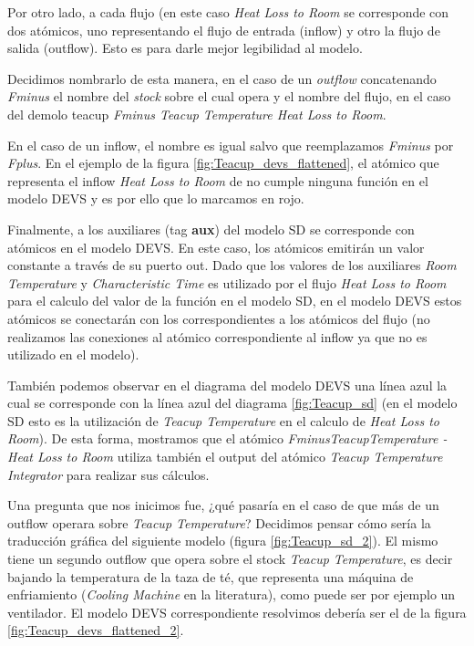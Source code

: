 Por otro lado, a cada flujo (en este caso \textit{Heat Loss to Room} se corresponde con dos atómicos, uno representando el flujo de entrada (inflow) y otro la flujo de salida (outflow). Esto es para darle mejor legibilidad al modelo.

Decidimos nombrarlo de esta manera, en el caso de un \textit{outflow} concatenando \textit{Fminus} el nombre del \textit{stock} sobre el cual opera y el nombre del flujo, en el caso del demolo teacup \textit{Fminus Teacup Temperature Heat Loss to Room}.

En el caso de un inflow, el nombre es igual salvo que reemplazamos \textit{Fminus} por \textit{Fplus}. En el ejemplo de la figura \ref{fig:Teacup_devs_flattened}, el atómico que representa el inflow \textit{Heat Loss to Room} de no cumple ninguna función en el modelo DEVS y es por ello que lo marcamos en rojo. 

Finalmente, a los auxiliares (tag \textbf{aux}) del modelo SD se corresponde con atómicos en el modelo DEVS. En este caso, los atómicos emitirán un valor constante a través de su puerto out. Dado que los valores de los auxiliares \textit{Room Temperature} y \textit{Characteristic Time} es utilizado por el flujo \textit{Heat Loss to Room} para el calculo del valor de la función en el modelo SD, en el modelo DEVS estos atómicos se conectarán con los correspondientes a los atómicos del flujo (no realizamos las conexiones al atómico correspondiente al inflow ya que no es utilizado en el modelo).

También podemos observar en el diagrama del modelo DEVS una línea azul la cual se corresponde con la línea azul del diagrama \ref{fig:Teacup_sd} (en el modelo SD esto es la utilización de \textit{Teacup Temperature} en el calculo de \textit{Heat Loss to Room}). De esta forma, mostramos que el atómico \textit{FminusTeacupTemperature - Heat Loss to Room} utiliza también el output del atómico \textit{Teacup Temperature Integrator} para realizar sus cálculos. 


Una pregunta que nos inicimos fue, ¿qué pasaría en el caso de que más de un outflow operara sobre \textit{Teacup Temperature}?
Decidimos pensar cómo sería la traducción gráfica del siguiente modelo (figura \ref{fig:Teacup_sd_2}). El mismo tiene un segundo outflow que opera sobre el stock \textit{Teacup Temperature}, es decir bajando la temperatura de la taza de té, que representa una máquina de enfriamiento (\textit{Cooling Machine} en la literatura), como puede ser por ejemplo un ventilador. El modelo DEVS correspondiente resolvimos debería ser el de la figura \ref{fig:Teacup_devs_flattened_2}. 

